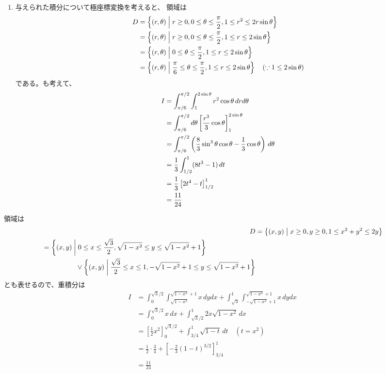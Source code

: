 \begin{ans*}
\begin{enumerate}[label=(\arabic*)]
    \item
    与えられた積分について極座標変換を考えると、
    領域は
    \begin{align}
      D &= \left\{ (r,{\theta})\mathrel{}\middle| \mathrel{} r\geq 0, 0\leq{\theta}\leq\frac{\pi}{2}, 1\leq r^2 \leq 2r\sin{\theta} \right\}\\
        &= \left\{ (r,{\theta})\mathrel{}\middle| \mathrel{} r\geq 0, 0\leq{\theta}\leq\frac{\pi}{2}, 1\leq r \leq 2\sin{\theta} \right\}\\
        &= \left\{ (r,{\theta})\mathrel{}\middle| \mathrel{} 0\leq{\theta}\leq\frac{\pi}{2}, 1\leq r \leq 2\sin{\theta} \right\}\\
        &= \left\{ (r,{\theta})\mathrel{}\middle| \mathrel{} \frac{\pi}{6}\leq{\theta}\leq\frac{\pi}{2}, 1\leq r \leq 2\sin{\theta} \right\}\quad(\because 1\leq 2\sin{\theta})
    \end{align}
    である。も考えて、
    \begin{align}
      I
      &= \int_{\pi/6}^{\pi/2}\int_{1}^{2\sin{\theta}} r^2\cos{\theta} \,drd{\theta}  \\
      &= \int_{\pi/6}^{\pi/2}d{\theta} \left[ \frac{r^3}{3}\cos{\theta} \right]_{1}^{2\sin{\theta}} \\
      &= \int_{\pi/6}^{\pi/2}\left( \frac{8}{3}\sin^3{\theta}\cos{\theta} - \frac{1}{3}\cos{\theta} \right) \,d{\theta} \\
      &= \frac{1}{3}\int_{1/2}^{1}(8t^3-1) \,dt \\
      &= \frac{1}{3}\left[ 2t^4 - t \right]_{1/2}^{1} \\
      &= \frac{11}{24}
    \end{align}
  \end{enumerate}
\end{ans*}
\begin{other*}
  領域は
  \begin{align}
    D
    &= \left\{(x,y)\mathrel{}\middle| \mathrel{} x\geq 0, y\geq 0, 1\leq x^2 + y^2\leq 2y\right\} \\
    \begin{split}
      &= \left\{(x,y)\mathrel{}\middle| \mathrel{} 0\leq x\leq \frac{\sqrt{3}}{2}, \sqrt{1-x^2}\leq y\leq \sqrt{1-x^2}+1 \right\} \\
      &\hspace*{50pt} \vee \left\{(x,y)\mathrel{}\middle| \mathrel{} \frac{\sqrt{3}}{2}\leq x\leq 1, -\sqrt{1-x^2}+1\leq y\leq \sqrt{1-x^2}+1 \right\}
    \end{split}
  \end{align}
  とも表せるので、重積分は
  \begin{align}
    I
    &= \int_{0}^{\sqrt{3}/2}\int_{\sqrt{1-x^2}}^{\sqrt{1-x^2}+1} x\,dydx
       + \int_{\sqrt{3}}^{1}\int_{-\sqrt{1-x^2}+1}^{\sqrt{1-x^2}+1}x\,dydx \\
    &= \int_{0}^{\sqrt{3}/2} x \,dx + \int_{\sqrt{3}/2}^{1}2x\sqrt{1-x^2}\,dx \\
    &= \left[\frac{1}{2}x^2\right]_{0}^{\sqrt{3}/2} + \int_{3/4}^{1}\sqrt{1-t}\,dt \quad(t=x^2) \\
    &= \frac{1}{2}\cdot\frac{3}{4} + \left[-\frac{2}{3}(1-t)^{3/2}\right]_{3/4}^{1} \\
    &= \frac{11}{24}
  \end{align}
\end{other*}



